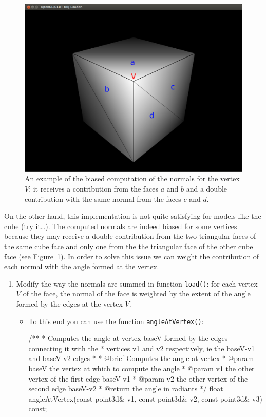 \documentclass[a4paper,11pt]{article}
\newcommand{\hilight}[1]{\colorbox{bg}{#1}}
\newcommand{\code}[1]{\hilight{\texttt{#1}}}
\newcommand{\fig}[1]{\hyperref[#1]{\mbox{Figure \ref*{#1}}}\xspace}
\begin{document}
\begin{figure}
\centering
\includegraphics[width=.6\columnwidth]{cubenormal}
\caption{An example of the biased computation of the normals for the vertex $V$: it receives a contribution from the faces $a$ and $b$ and a double contribution with the same normal from the faces $c$ and $d$.}
\label{fig:cubenormal}
\end{figure}

On the other hand, this implementation is not quite satisfying for models like the cube (try it\ldots). The computed normals are indeed biased for some vertices because they may receive a double contribution from the two triangular faces of the same cube face and only one from the the triangular face of the other cube face (see \fig{fig:cubenormal}). In order to solve this issue we can weight the contribution of each normal with the angle formed at the vertex.

\begin{enumerate}
    \item Modify the way the normals are summed in function \code{load()}: for each vertex $V$ of the face, the normal of the face is weighted by the extent of the angle formed by the edges at the vertex $V$.
     \begin{itemize}
        \item To this end you can use the function \code{angleAtVertex()}: \\
{\smaller
\begin{cppcode}
/**
* Computes the angle at vertex baseV formed by the edges connecting it with the
* vertices v1 and v2 respectively, ie the baseV-v1 and baseV-v2 edges
* 
* @brief Computes the angle at vertex
* @param baseV the vertex at which to compute the angle
* @param v1 the other vertex of the first edge baseV-v1
* @param v2 the other vertex of the second edge baseV-v2
* @return the angle in radiants
*/
float angleAtVertex(const point3d& v1, const point3d& v2, const point3d& v3) const;
\end{cppcode}
}
        \end{itemize}
 \end{enumerate}   
\end{document}
